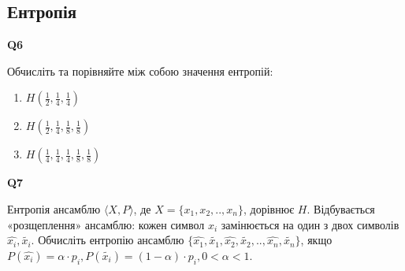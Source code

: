 \documentclass{../../test-template}
\begin{document}
\subsection{Ентропія}
\begin{tcolorbox}[lowerbox=invisible,colback=white]
    \begin{minipage}{0.1\textwidth}
        \raggedright
        \vspace*{\fill}
            \textbf{Q6}
        \vspace*{\fill}
        \end{minipage}
        \begin{minipage}{0.75\textwidth}
        Обчисліть та порівняйте між собою значення ентропій:
        \begin{enumerate}
            \item $H(\frac{1}{2},\frac{1}{4},\frac{1}{4})$
            \item $H(\frac{1}{2},\frac{1}{4},\frac{1}{8},\frac{1}{8})$
            \item $H(\frac{1}{4},\frac{1}{4},\frac{1}{4},\frac{1}{8},\frac{1}{8})$
        \end{enumerate}
        \end{minipage}
\end{tcolorbox}
\begin{tcolorbox}[lowerbox=invisible,colback=white]
    \begin{minipage}{0.1\textwidth}
        \raggedright
        \vspace*{\fill}
            \textbf{Q7}
        \vspace*{\fill}
        \end{minipage}
        \begin{minipage}{0.75\textwidth}
        Ентропія ансамблю $\langle X,P\rangle$, де $X=\{x_1,x_2,..,x_n\}$, дорівнює $H$. Відбувається «розщеплення» ансамблю: кожен символ $x_i$ замінюється на один з двох символів $\widehat{x_i},\widetilde{x_i}$. Обчисліть ентропію ансамблю $\{\widehat{x_1},\widetilde{x_1},\widehat{x_2},\widetilde{x_2},..,\widehat{x_n},\widetilde{x_n}\}$, якщо $P(\widehat{x_i})=\alpha\cdot p_i, P(\widetilde{x_i})=(1-\alpha)\cdot p_i, 0<\alpha<1.$
        \end{minipage}
\end{tcolorbox}
\end{document}
